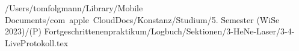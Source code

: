 /Users/tomfolgmann/Library/Mobile Documents/com~apple~CloudDocs/Konstanz/Studium/5. Semester (WiSe 2023)/(P) Fortgeschrittenenpraktikum/Logbuch/Sektionen/3-HeNe-Laser/3-4-LiveProtokoll.tex